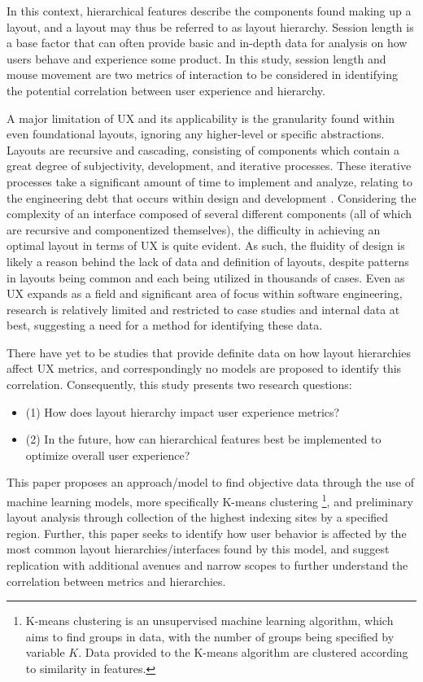 \documentclass[conference]{IEEEtran}
\begin{document}
In this context, hierarchical features describe the components found making up a layout, and a layout may thus be referred to as layout hierarchy. Session length is a base factor that can often provide basic and in-depth data for analysis on how users behave and experience some product. In this study, session length and mouse movement are two metrics of interaction to be considered in identifying the potential correlation between user experience and hierarchy.

A major limitation of UX and its applicability is the granularity found within even foundational layouts, ignoring any higher-level or specific abstractions. Layouts are recursive and cascading, consisting of components which contain a great degree of subjectivity, development, and iterative processes. These iterative processes take a significant amount of time to implement and analyze, relating to the engineering debt that occurs within design and development \cite{4293575}. Considering the complexity of an interface composed of several different components (all of which are recursive and componentized themselves), the difficulty in achieving an optimal layout in terms of UX is quite evident. As such, the fluidity of design is likely a reason behind the lack of data and definition of layouts, despite patterns in layouts being common and each being utilized in thousands of cases. Even as UX expands as a field and significant area of focus within software engineering, research is relatively limited and restricted to case studies and internal data at best, suggesting a need for a method for identifying these data.

There have yet to be studies that provide definite data on how layout hierarchies affect UX metrics, and correspondingly no models are proposed to identify this correlation. Consequently, this study presents two research questions:

\renewcommand{\labelitemi}{$\textendash$}
\begin{itemize}
  \item (1) How does layout hierarchy impact user experience metrics?
  \item (2) In the future, how can hierarchical features best be implemented to optimize overall user experience?
\end{itemize}


This paper proposes an approach/model to find objective data through the use of machine learning models, more specifically K-means clustering \footnote{K-means clustering is an unsupervised machine learning algorithm, which aims to find groups in data, with the number of groups being specified by variable \(K\). Data provided to the K-means algorithm are clustered according to similarity in features.}, and preliminary layout analysis through collection of the highest indexing sites by a specified region. Further, this paper seeks to identify how user behavior is affected by the most common layout hierarchies/interfaces found by this model, and suggest replication with additional avenues and narrow scopes to further understand the correlation between metrics and hierarchies.
\end{document}
